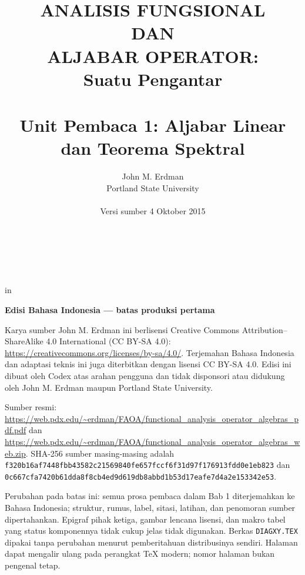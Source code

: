 \documentclass[11pt,reqno]{amsbook}
\theoremstyle{definition}
\theoremstyle{remark}
\numberwithin{equation}{section}
\begin{document}
 \frontmatter
 \title{ANALISIS FUNGSIONAL \\ DAN \\ ALJABAR OPERATOR: \\ Suatu Pengantar \\ \mbox{} \\ \large Unit Pembaca 1: Aljabar Linear dan Teorema Spektral}
 \author{John M. Erdman \\
      Portland State University \\
      \mbox{\hphantom{P}} \\
      Versi sumber 4 Oktober 2015 \\
      \mbox{\hphantom{P}} \\
      \mbox{\hphantom{P}} \\
            \mbox{\hphantom{P}} \\
                  \mbox{\hphantom{P}} }


 in


\maketitle


\begin{center}
\textbf{Edisi Bahasa Indonesia --- batas produksi pertama}
\end{center}

Karya sumber John M. Erdman ini berlisensi Creative Commons
Attribution--ShareAlike 4.0 International (CC BY-SA 4.0):
\url{https://creativecommons.org/licenses/by-sa/4.0/}.
Terjemahan Bahasa Indonesia dan adaptasi teknis ini juga diterbitkan dengan
lisensi CC BY-SA 4.0. Edisi ini dibuat oleh Codex atas arahan pengguna dan tidak
disponsori atau didukung oleh John M. Erdman maupun Portland State University.

\begin{sloppypar}
Sumber resmi:
\url{https://web.pdx.edu/~erdman/FAOA/functional_analysis_operator_algebras_pdf.pdf}
dan
\url{https://web.pdx.edu/~erdman/FAOA/functional_analysis_operator_algebras_web.zip}.
SHA-256 sumber masing-masing adalah
\texttt{f320b16af7448fbb43582c21569840fe\allowbreak657fccf6f31d97f176913fdd0e1eb823}
dan
\texttt{0c667cfa7420b61dda8f8cb4ed9d619d\allowbreak b8abbd1b53d17eafe7d4a2e153342e53}.
\end{sloppypar}

Perubahan pada batas ini: semua prosa pembaca dalam Bab 1 diterjemahkan ke
Bahasa Indonesia; struktur, rumus, label, sitasi, latihan, dan penomoran sumber
dipertahankan. Epigraf pihak ketiga, gambar lencana lisensi, dan makro tabel
yang status komponennya tidak cukup jelas tidak digunakan. Berkas
\texttt{DIAGXY.TEX} dipakai tanpa perubahan menurut pemberitahuan distribusinya
sendiri. Halaman dapat
mengalir ulang pada perangkat TeX modern; nomor halaman bukan pengenal tetap.
\end{document}
